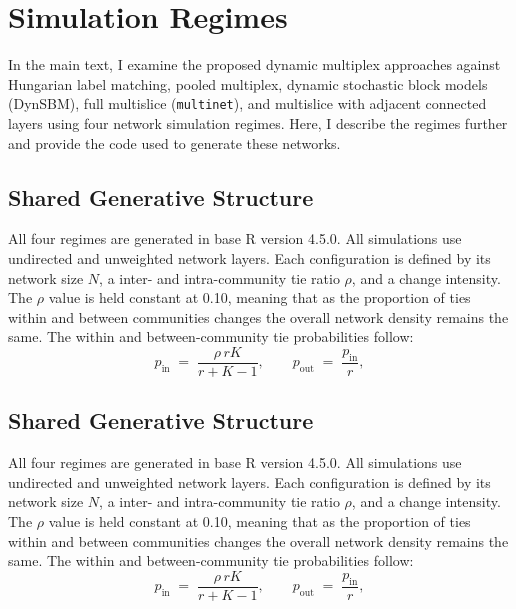 \documentclass[11pt, letterpaper]{article}
\renewcommand{\theequation}{\thesection.\arabic{equation}}
\numberwithin{equation}{section}
\begin{document}
\appendix
\renewcommand{\thesection}{A\arabic{section}}
\renewcommand{\thetable}{A\arabic{table}}
\renewcommand{\thefigure}{A\arabic{figure}}
\renewcommand{\theequation}{A\arabic{equation}}
\setcounter{section}{0}\setcounter{table}{0}
\setcounter{figure}{0}\setcounter{equation}{0}

\doublespacing
\setcounter{page}{1}
\renewcommand{\contentsname}{Table of Contents}
\vspace{-10pt}
\begin{singlespace}
\tableofcontents
\end{singlespace}\vspace{-10pt}

\newpage
\section{Simulation Regimes}
In the main text, I examine the proposed dynamic multiplex approaches against Hungarian label matching, pooled multiplex, dynamic stochastic block models (DynSBM), full multislice (\texttt{multinet}), and multislice with adjacent connected layers using four network simulation regimes. Here, I describe the regimes further and provide the code used to generate these networks. 

\subsection{Shared Generative Structure}
All four regimes are generated in base \textsf{R} version 4.5.0. All simulations use undirected and unweighted network layers. Each configuration is defined by its network size $N$, a inter- and intra-community tie ratio $\rho$, and a change intensity. The $\rho$ value is held constant at 0.10, meaning that as the proportion of ties within and between communities changes the overall network density remains the same. The within and between-community tie probabilities follow: \begin{equation}\label{eq:dens}
p_{\text{in}} \;=\; \frac{\rho\, r K}{r + K - 1},
\qquad
p_{\text{out}} \;=\; \frac{p_{\text{in}}}{r},
\end{equation}


\subsection{Shared Generative Structure}
All four regimes are generated in base \textsf{R} version 4.5.0. All simulations use undirected and unweighted network layers. Each configuration is defined by its network size $N$, a inter- and intra-community tie ratio $\rho$, and a change intensity. The $\rho$ value is held constant at 0.10, meaning that as the proportion of ties within and between communities changes the overall network density remains the same. The within and between-community tie probabilities follow: \begin{equation}\label{eq:dens}
p_{\text{in}} \;=\; \frac{\rho\, r K}{r + K - 1},
\qquad
p_{\text{out}} \;=\; \frac{p_{\text{in}}}{r},
\end{equation}
\end{document}
